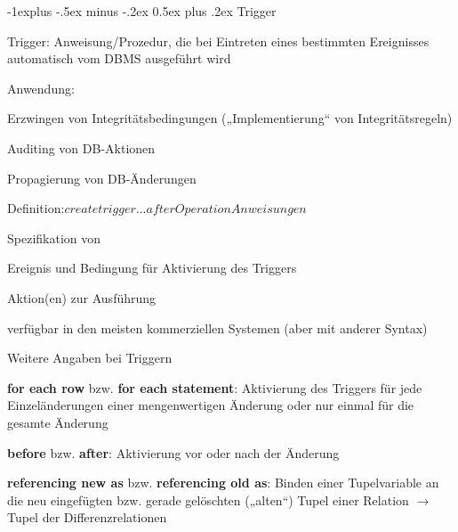\documentclass[a4paper]{article}
\makeatletter
\renewcommand{\subsection}{\@startsection{subsection}{2}{0mm}%
                                {-1explus -.5ex minus -.2ex}%
                                {0.5ex plus .2ex}%
                                {\normalfont\normalsize\bfseries}}
\makeatother
\begin{document}
\begin{multicols}{3}
\begin{itemize*}
    \subsection{Trigger}
    \begin{itemize*}
        \item Trigger: Anweisung/Prozedur, die bei Eintreten eines bestimmten Ereignisses automatisch vom DBMS ausgeführt wird
        \item Anwendung:
        \begin{itemize*}
            \item Erzwingen von Integritätsbedingungen („Implementierung“ von Integritätsregeln)
            \item Auditing von DB-Aktionen
            \item Propagierung von DB-Änderungen
        \end{itemize*}
        \item Definition:$create trigger ...  after Operation  Anweisungen$
        \item Spezifikation von
        \begin{itemize*}
            \item Ereignis und Bedingung für Aktivierung des Triggers
            \item Aktion(en) zur Ausführung
        \end{itemize*}
        \item verfügbar in den meisten kommerziellen Systemen (aber mit anderer Syntax)
        \item Weitere Angaben bei Triggern
        \begin{itemize*}
            \item \textbf{for each row} bzw. \textbf{for each statement}: Aktivierung des Triggers für jede Einzeländerungen einer mengenwertigen Änderung oder nur einmal für die gesamte Änderung
            \item \textbf{before} bzw. \textbf{after}: Aktivierung vor oder nach der Änderung
            \item \textbf{referencing new as} bzw. \textbf{referencing old as}: Binden einer Tupelvariable an die neu eingefügten bzw. gerade gelöschten („alten“) Tupel einer Relation $\rightarrow$ Tupel der Differenzrelationen
        \end{itemize*}
    \end{itemize*}


\end{itemize*}
\end{multicols}
\end{document}
